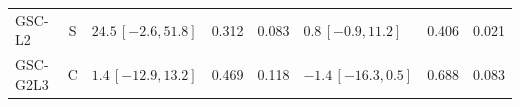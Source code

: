 \begin{longtable}{lcp{37mm}rrp{37mm}rr}
GSC-L2 & S & \(24.5\,[-2.6,51.8]\) & 0.312 & 0.083 & \(0.8\,[-0.9,11.2]\) & 0.406 & 0.021\\
GSC-G2L3 & C & \(1.4\,[-12.9,13.2]\) & 0.469 & 0.118 & \(-1.4\,[-16.3,0.5]\) & 0.688 & 0.083\\

\end{longtable}
